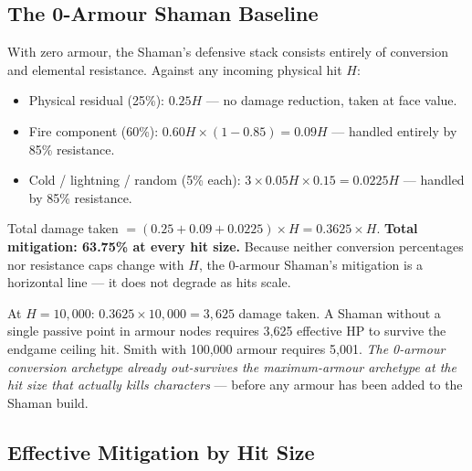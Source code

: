 \documentclass[12pt, letterpaper]{article}
\begin{document}
\subsection*{The 0-Armour Shaman Baseline}

With zero armour, the Shaman's defensive stack consists entirely of conversion and elemental resistance. Against any incoming physical hit $H$:

\begin{itemize}
    \item Physical residual (25\%): $0.25H$ --- no damage reduction, taken at face value.
    \item Fire component (60\%): $0.60H \times (1 - 0.85) = 0.09H$ --- handled entirely by 85\% resistance.
    \item Cold / lightning / random (5\% each): $3 \times 0.05H \times 0.15 = 0.0225H$ --- handled by 85\% resistance.
\end{itemize}

Total damage taken $= (0.25 + 0.09 + 0.0225) \times H = 0.3625 \times H$. \textbf{Total mitigation: 63.75\% at every hit size.} Because neither conversion percentages nor resistance caps change with $H$, the 0-armour Shaman's mitigation is a horizontal line --- it does not degrade as hits scale.

At $H = 10{,}000$: $0.3625 \times 10{,}000 = 3{,}625$ damage taken. A Shaman without a single passive point in armour nodes requires 3{,}625 effective HP to survive the endgame ceiling hit. Smith with 100{,}000 armour requires 5{,}001. \textit{The 0-armour conversion archetype already out-survives the maximum-armour archetype at the hit size that actually kills characters} --- before any armour has been added to the Shaman build.

\subsection*{Effective Mitigation by Hit Size}
\end{document}

